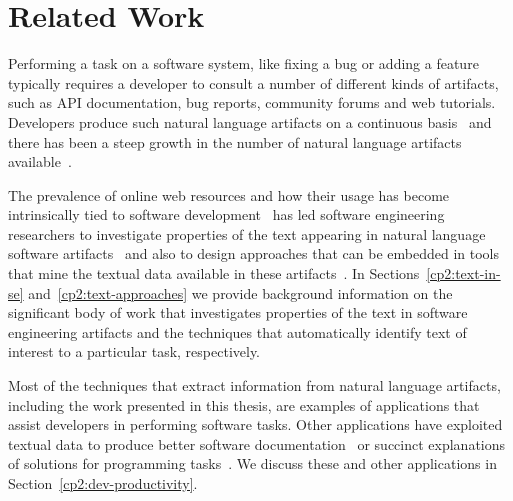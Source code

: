\setcounter{chapter}{1}


\chapter{Related Work}
\label{ch:related-work}








Performing a task on a software system, like fixing a bug
or adding a feature typically requires a developer to consult
a number of different kinds of artifacts, such
as API documentation, bug reports, community forums
and web tutorials. 
Developers produce such natural language artifacts on a 
continuous basis~\cite{Rastkar2013t} 
and there has been a steep growth in the number 
of natural language artifacts available~\cite{Bavota2016, aa}.


The prevalence of online web resources and how their usage has become intrinsically tied to software development~\cite{} has led 
 software engineering researchers to 
investigate 
properties of the text 
appearing in natural language software artifacts~\cite{aa}
and also to design approaches that 
can be embedded in
tools that mine the textual data available in these artifacts~\cite{aa}.
In Sections~\ref{cp2:text-in-se} and~\ref{cp2:text-approaches}
we  provide background information on the significant body 
of work that investigates properties of the text in software engineering 
artifacts and the techniques that automatically identify text of interest 
to a particular task, respectively.







Most of the techniques that extract information from natural 
language artifacts, including the work presented in this thesis, 
are examples of applications that assist developers in performing 
software tasks. 
Other applications have exploited textual data
to produce better software documentation~\cite{Treude2016, mcburney2014, robillard2017} 
or  succinct  explanations of solutions for programming tasks~\cite{silva2019}.
We discuss these and other applications in Section~\ref{cp2:dev-productivity}.








% 

% 


% 
% 
% 